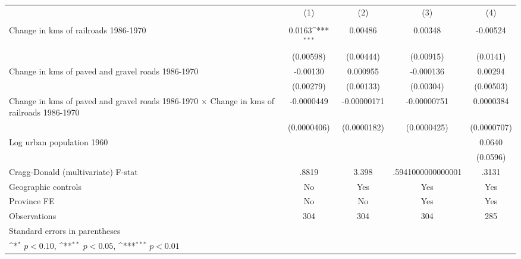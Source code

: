 {
\def\sym#1{\ifmmode^{#1}\else\(^{#1}\)\fi}
\begin{tabular}{l*{4}{c}}
\hline\hline
                &\multicolumn{1}{c}{(1)}&\multicolumn{1}{c}{(2)}&\multicolumn{1}{c}{(3)}&\multicolumn{1}{c}{(4)}\\
                &\multicolumn{1}{c}{}&\multicolumn{1}{c}{}&\multicolumn{1}{c}{}&\multicolumn{1}{c}{}\\
\hline
Change in kms of railroads 1986-1970&   0.0163\sym{***}&  0.00486         &  0.00348         & -0.00524         \\
                &(0.00598)         &(0.00444)         &(0.00915)         & (0.0141)         \\
[1em]
Change in kms of paved and gravel roads 1986-1970& -0.00130         & 0.000955         &-0.000136         &  0.00294         \\
                &(0.00279)         &(0.00133)         &(0.00304)         &(0.00503)         \\
[1em]
Change in kms of paved and gravel roads 1986-1970 $\times$ Change in kms of railroads 1986-1970&-0.0000449         &-0.00000171         &-0.00000751         &0.0000384         \\
                &(0.0000406)         &(0.0000182)         &(0.0000425)         &(0.0000707)         \\
[1em]
Log urban population 1960&                  &                  &                  &   0.0640         \\
                &                  &                  &                  & (0.0596)         \\
\hline
Cragg-Donald (multivariate) F-stat&    .8819         &    3.398         &.5941000000000001         &    .3131         \\
Geographic controls&       No         &      Yes         &      Yes         &      Yes         \\
Province FE     &       No         &       No         &      Yes         &      Yes         \\
Observations    &      304         &      304         &      304         &      285         \\
\hline\hline
\multicolumn{5}{l}{\footnotesize Standard errors in parentheses}\\
\multicolumn{5}{l}{\footnotesize \sym{*} \(p<0.10\), \sym{**} \(p<0.05\), \sym{***} \(p<0.01\)}\\
\end{tabular}
}
